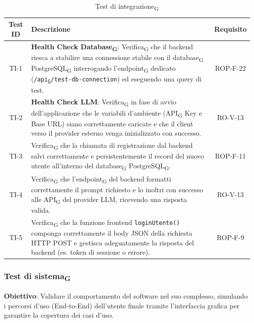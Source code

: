 \documentclass[11pt,a4paper]{article}
\newcommand{\gls}[1]{#1\textsubscript{G}}
\begin{document}
\begin{table}[H]
    \centering
    \small
    \begin{tabularx}{\textwidth}{|c|X|c|}
        \hline
        \textbf{Test ID} & \textbf{Descrizione} & \textbf{Requisito} \\
        \hline
        TI-1 & \textbf{Health Check \gls{Database}}: \gls{Verifica} che il backend riesca a stabilire una connessione stabile con il \gls{database} \gls{PostgreSQL} interrogando l'\gls{endpoint} dedicato (\texttt{/\gls{api}/test-db-connection}) ed eseguendo una query di test. & ROP-F-22 \\
        \hline
        TI-2 & \textbf{Health Check LLM}: \gls{Verifica} in fase di avvio dell'applicazione che le variabili d'ambiente (\gls{API} Key e Base URL) siano correttamente caricate e che il client verso il provider esterno venga inizializzato con successo. & RO-V-13 \\
        \hline
        TI-3 & \gls{Verifica} che la chiamata di registrazione dal backend salvi correttamente e persistentemente il record del nuovo utente all'interno del \gls{database} \gls{PostgreSQL}. & ROP-F-11 \\
        \hline
        TI-4 & \gls{Verifica} che l'\gls{endpoint} del backend formatti correttamente il prompt richiesto e lo inoltri con successo alle \gls{API} del provider LLM, ricevendo una risposta valida. & RO-V-13 \\
        \hline
        TI-5 & \gls{Verifica} che la funzione frontend \texttt{loginUtente()} componga correttamente il body JSON della richiesta HTTP POST e gestisca adeguatamente la risposta del backend (es. token di sessione o errore). & ROP-F-9 \\
        \hline
    \end{tabularx}
    \caption{\gls{Test di integrazione}}
\end{table}

\subsubsection{\gls{Test di sistema}}
\textbf{Obiettivo}: Validare il comportamento del software nel suo complesso, simulando i percorsi d'uso (End-to-End) dell'utente finale tramite l'interfaccia grafica per garantire la copertura dei casi d'uso.
\end{document}

